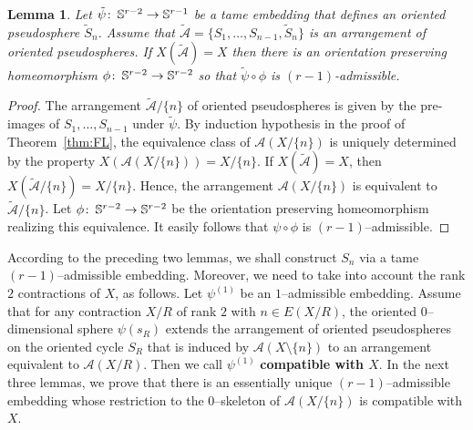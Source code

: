 \documentclass[a4paper]{amsart}
\def\co{\colon\thinspace}
\newcommand{\begriff}[1]{\textbf{#1}}
\newcommand{\p}{\mathbb S}
\newtheorem{lemma}{Lemma}
\theoremstyle{definition}
\theoremstyle{remark}
\begin{document}
\begin{lemma}\label{lem:arrangementadmissibel}
  Let $\tilde\psi\co\p^{r-2}\to\p^{r-1}$ be a tame embedding that defines an
  oriented pseudosphere $\tilde S_n$. Assume that $\tilde{\mathcal
  A}=\{S_1,\dots,S_{n-1},\tilde S_n\}$ is an arrangement of oriented 
  pseudospheres.
  If $X(\tilde{\mathcal A}) = X$ then there is an orientation preserving
  homeomorphism $\phi\co \p^{r-2}\to 
  \p^{r-2}$ so that $\tilde\psi\circ \phi$ is $(r-1)$-admissible.
\end{lemma}
%
\begin{proof}
  The arrangement $\tilde{\mathcal
    A}/\{n\}$ of oriented pseudospheres is given by the pre-images of
  $S_1,\dots,S_{n-1}$ under $\tilde\psi$.  By induction hypothesis in
  the proof of Theorem~\ref{thm:FL}, the equivalence class of ${\mathcal
    A}(X/\{n\})$ is uniquely determined by the property $X({\mathcal
    A}(X/\{n\})) = X/\{n\}$.  If $X(\tilde{\mathcal A}) = X$, then
  $X(\tilde{\mathcal A}/\{n\}) = X/\{n\}$. Hence, the arrangement 
  ${\mathcal A}(X/\{n\})$ is equivalent to $\tilde{\mathcal A}/\{n\}$.
  Let $\phi\co \p^{r-2}\to \p^{r-2}$ be the orientation preserving
  homeomorphism realizing this equivalence.  It easily follows  that
  $\psi\circ\phi$ is $(r-1)$--admissible.
\end{proof}

According to the preceding two lemmas, we shall construct $S_n$ via
a tame $(r-1)$--admissible embedding. Moreover, we need to take into
account the rank $2$ contractions of $X$, as follows.
%
Let $\psi^{(1)}$ be an $1$--admissible embedding. 
Assume that for any contraction $X/R$ of rank $2$ with $n\in E(X/R)$, the
oriented $0$--dimensional sphere $\psi(s_{R})$ extends the arrangement of
oriented pseudospheres on the oriented cycle $S_R$ that is induced by
$\mathcal A(X\setminus\{n\})$ to an arrangement equivalent to $\mathcal
A(X/R)$.   
Then we call $\psi^{(1)}$ \begriff{compatible with $X$}. 
%
In the next three lemmas, we prove that there is an essentially unique
$(r-1)$--admissible embedding whose restriction to the $0$--skeleton of
$\mathcal A(X/\{n\})$ is compatible with $X$. 
\end{document}
